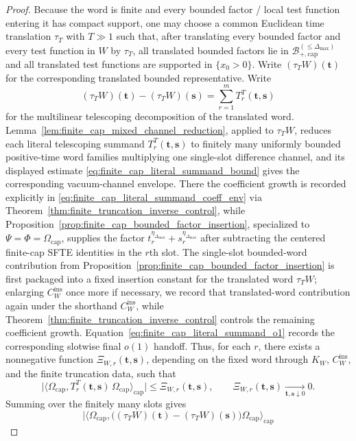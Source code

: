 \begin{proof}
Because the word is finite and every bounded factor / local test function entering it has compact support, one may choose a common Euclidean time translation $\tau_T$ with $T\gg 1$ such that, after translating every bounded factor and every test function in $W$ by $\tau_T$, all translated bounded factors lie in
$\mathcal B_{+,\mathrm{cap}}^{(\le \Delta_{\max})}$ and all translated test functions are supported in $\{x_0>0\}$.
Write $(\tau_T W)(\mathbf t)$ for the corresponding translated bounded representative.
Write
\[
(\tau_T W)(\mathbf t)-(\tau_T W)(\mathbf s)=\sum_{r=1}^m T_r^T(\mathbf t,\mathbf s)
\]
for the multilinear telescoping decomposition of the translated word.
Lemma~\ref{lem:finite_cap_mixed_channel_reduction}, applied to $\tau_T W$, reduces each literal telescoping summand $T_r^T(\mathbf t,\mathbf s)$ to finitely many uniformly bounded positive-time word families multiplying one single-slot difference channel, and its displayed estimate \eqref{eq:finite_cap_literal_summand_bound} gives the corresponding vacuum-channel envelope.
There the coefficient growth is recorded explicitly in \eqref{eq:finite_cap_literal_summand_coeff_env} via Theorem~\ref{thm:finite_truncation_inverse_control}, while Proposition~\ref{prop:finite_cap_bounded_factor_insertion}, specialized to $\Psi=\Phi=\Omega_{\mathrm{cap}}$, supplies the factor $t_r^{\eta_{\Delta_{\max}}}+s_r^{\eta_{\Delta_{\max}}}$ after subtracting the centered finite-cap SFTE identities in the $r$th slot.
The single-slot bounded-word contribution from Proposition~\ref{prop:finite_cap_bounded_factor_insertion} is first packaged into a fixed insertion constant for the translated word $\tau_TW$; enlarging $C_W^{\mathrm{ins}}$ once more if necessary, we record that translated-word contribution again under the shorthand $C_W^{\mathrm{ins}}$, while Theorem~\ref{thm:finite_truncation_inverse_control} controls the remaining coefficient growth.
Equation~\eqref{eq:finite_cap_literal_summand_o1} records the corresponding slotwise final $o(1)$ handoff.
Thus, for each $r$, there exists a nonnegative function $\Xi_{W,r}(\mathbf t,\mathbf s)$, depending on the fixed word through $K_W$, $C_W^{\mathrm{ins}}$, and the finite truncation data, such that
\[
\big|
\big\langle \Omega_{\mathrm{cap}},T_r^T(\mathbf t,\mathbf s)\,\Omega_{\mathrm{cap}}\big\rangle_{\mathrm{cap}}
\big|
\le
\Xi_{W,r}(\mathbf t,\mathbf s),
\qquad
\Xi_{W,r}(\mathbf t,\mathbf s)\xrightarrow[\mathbf t,\mathbf s\downarrow 0]{}0.
\]
Summing over the finitely many slots gives
\[
\big|
\big\langle \Omega_{\mathrm{cap}},\bigl((\tau_T W)(\mathbf t)-(\tau_T W)(\mathbf s)\bigr)\Omega_{\mathrm{cap}}\big\rangle_{\mathrm{cap}}
\]
\end{proof}
